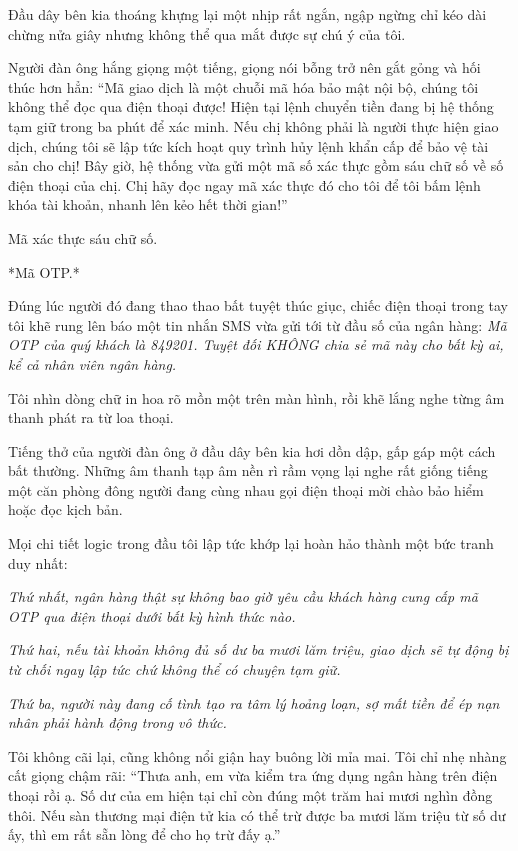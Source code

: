 \documentclass[../main.tex]{subfiles}
\begin{document}
Đầu dây bên kia thoáng khựng lại một nhịp rất ngắn, ngập ngừng chỉ kéo dài chừng nửa giây nhưng không thể qua mắt được sự chú ý của tôi.

Người đàn ông hắng giọng một tiếng, giọng nói bỗng trở nên gắt gỏng và hối thúc hơn hẳn: ``Mã giao dịch là một chuỗi mã hóa bảo mật nội bộ, chúng tôi không thể đọc qua điện thoại được! Hiện tại lệnh chuyển tiền đang bị hệ thống tạm giữ trong ba phút để xác minh. Nếu chị không phải là người thực hiện giao dịch, chúng tôi sẽ lập tức kích hoạt quy trình hủy lệnh khẩn cấp để bảo vệ tài sản cho chị! Bây giờ, hệ thống vừa gửi một mã số xác thực gồm sáu chữ số về số điện thoại của chị. Chị hãy đọc ngay mã xác thực đó cho tôi để tôi bấm lệnh khóa tài khoản, nhanh lên kẻo hết thời gian!''

Mã xác thực sáu chữ số.

*Mã OTP.*

Đúng lúc người đó đang thao thao bất tuyệt thúc giục, chiếc điện thoại trong tay tôi khẽ rung lên báo một tin nhắn SMS vừa gửi tới từ đầu số của ngân hàng: \textit{Mã OTP của quý khách là 849201. Tuyệt đối KHÔNG chia sẻ mã này cho bất kỳ ai, kể cả nhân viên ngân hàng.}

Tôi nhìn dòng chữ in hoa rõ mồn một trên màn hình, rồi khẽ lắng nghe từng âm thanh phát ra từ loa thoại.

Tiếng thở của người đàn ông ở đầu dây bên kia hơi dồn dập, gấp gáp một cách bất thường. Những âm thanh tạp âm nền rì rầm vọng lại nghe rất giống tiếng một căn phòng đông người đang cùng nhau gọi điện thoại mời chào bảo hiểm hoặc đọc kịch bản.

Mọi chi tiết logic trong đầu tôi lập tức khớp lại hoàn hảo thành một bức tranh duy nhất:

\textit{Thứ nhất, ngân hàng thật sự không bao giờ yêu cầu khách hàng cung cấp mã OTP qua điện thoại dưới bất kỳ hình thức nào.}

\textit{Thứ hai, nếu tài khoản không đủ số dư ba mươi lăm triệu, giao dịch sẽ tự động bị từ chối ngay lập tức chứ không thể có chuyện tạm giữ.}

\textit{Thứ ba, người này đang cố tình tạo ra tâm lý hoảng loạn, sợ mất tiền để ép nạn nhân phải hành động trong vô thức.}

Tôi không cãi lại, cũng không nổi giận hay buông lời mỉa mai. Tôi chỉ nhẹ nhàng cất giọng chậm rãi: ``Thưa anh, em vừa kiểm tra ứng dụng ngân hàng trên điện thoại rồi ạ. Số dư của em hiện tại chỉ còn đúng một trăm hai mươi nghìn đồng thôi. Nếu sàn thương mại điện tử kia có thể trừ được ba mươi lăm triệu từ số dư ấy, thì em rất sẵn lòng để cho họ trừ đấy ạ.''
\end{document}
